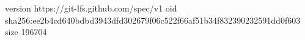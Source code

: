 version https://git-lfs.github.com/spec/v1
oid sha256:ee2b4cd640bdbd3943dfd302679f06c522f66af51b34f832390232591dd0f603
size 196704
